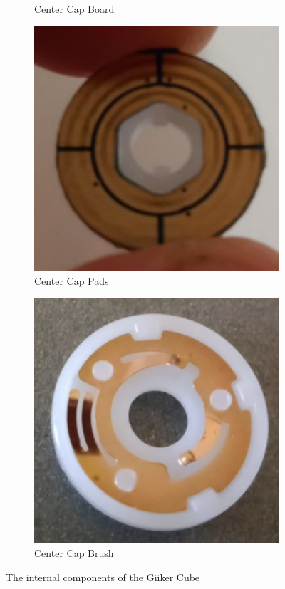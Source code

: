 \begin{figure}
\begin{subfigure}{0.25\textwidth}
        \caption{Center Cap Board \cite{eggins-giiker-internals}}
        \label{fig:giiker-center-front}
    \end{subfigure}%
    \begin{subfigure}{0.25\textwidth}
        \centering
        \includegraphics[width=.90\linewidth]{Figures/3 State of the Art/giiker-center-pads.png}
        \caption{Center Cap Pads \cite{eggins-giiker-internals}}
        \label{fig:giiker-center-pads}
    \end{subfigure}%
    \begin{subfigure}{0.25\textwidth}
        \centering
        \includegraphics[width=.90\linewidth]{Figures/3 State of the Art/giiker-center-brush.png}
        \caption{Center Cap Brush \cite{eggins-giiker-internals}}
        \label{fig:giiker-center-brush}
    \end{subfigure}%
    \caption{The internal components of the Giiker Cube}
    \label{fig:giiker-internal-components}
\end{figure}

